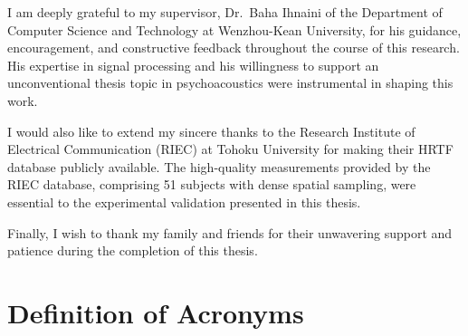 \documentclass[12pt,a4paper]{article}
\begin{document}
I am deeply grateful to my supervisor, Dr.\ Baha Ihnaini of the Department of Computer Science and Technology at Wenzhou-Kean University, for his guidance, encouragement, and constructive feedback throughout the course of this research. His expertise in signal processing and his willingness to support an unconventional thesis topic in psychoacoustics were instrumental in shaping this work.

I would also like to extend my sincere thanks to the Research Institute of Electrical Communication (RIEC) at Tohoku University for making their HRTF database publicly available. The high-quality measurements provided by the RIEC database, comprising 51 subjects with dense spatial sampling, were essential to the experimental validation presented in this thesis.

Finally, I wish to thank my family and friends for their unwavering support and patience during the completion of this thesis.

\newpage

\tableofcontents

\newpage

\listoffigures

\vspace{1cm}

\listoftables

\newpage

\section*{Definition of Acronyms}
\end{document}
